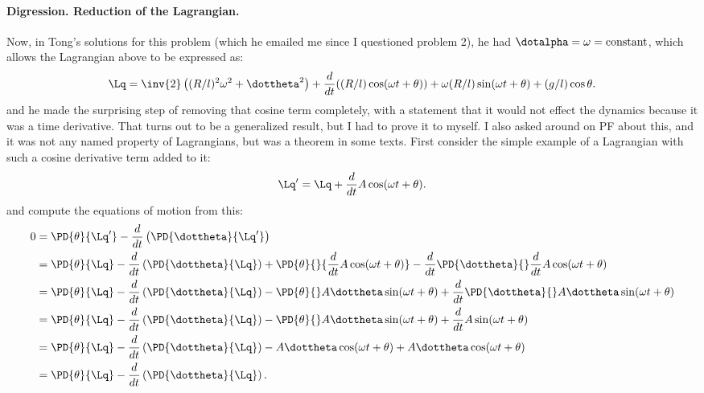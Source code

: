 {\paragraph{Digression.  Reduction of the Lagrangian.}
\label{chap:PJTongMf1:addDerivative}
%
Now, in Tong's solutions for this problem (which he emailed me since I questioned problem 2), he had \(\dotalpha = \omega = \text{constant}\), which allows the
Lagrangian above to be expressed as:
%
\begin{equation}\label{eqn:tongMf1:1560}
\Lq =
\inv{2} \left( (R/l)^2 \omega^2 + \dottheta^2 \right)
+ \frac{d}{dt} ((R/l) \cos( \omega t + \theta )) + \omega (R/l) \sin(\omega t + \theta)
+ (g/l) \cos\theta.
\end{equation}
%
and he made the surprising step of removing that cosine term completely, with a statement that it would not effect the dynamics because it was a time derivative.
That turns out to be a generalized result, but I had to prove it to myself.  I also asked around on PF about this, and it was not any named property of Lagrangians,
but was a theorem in some texts.
%
First consider the simple example of a Lagrangian with such a cosine derivative term added to it:
%
\begin{equation}\label{eqn:tongMf1:1580}
\Lq' = \Lq + \frac{d}{dt} A \cos(\omega t + \theta).
\end{equation}
%
and compute the equations of motion from this:
\begin{equation}\label{eqn:tongMf1:520}
\begin{aligned}
0
&= \PD{\theta}{\Lq'} - \frac{d}{dt}\left(\PD{\dottheta}{\Lq'}\right) \\
&= \PD{\theta}{\Lq} - \frac{d}{dt}\left(\PD{\dottheta}{\Lq}\right)
+ \PD{\theta}{} {\frac{d}{dt} A \cos(\omega t + \theta)}
- \frac{d}{dt} \PD{\dottheta}{} \frac{d}{dt} A \cos(\omega t + \theta) \\
&= \PD{\theta}{\Lq} - \frac{d}{dt}\left(\PD{\dottheta}{\Lq}\right)
- \PD{\theta}{} A \dottheta \sin(\omega t + \theta) +
\frac{d}{dt} \PD{\dottheta}{} A \dottheta \sin(\omega t + \theta) \\
&= \PD{\theta}{\Lq} - \frac{d}{dt}\left(\PD{\dottheta}{\Lq}\right)
- \PD{\theta}{} A \dottheta \sin(\omega t + \theta) + \frac{d}{dt} A \sin(\omega t + \theta) \\
&= \PD{\theta}{\Lq} - \frac{d}{dt}\left(\PD{\dottheta}{\Lq}\right)
- A \dottheta \cos(\omega t + \theta) + A \dottheta \cos(\omega t + \theta) \\
&= \PD{\theta}{\Lq} - \frac{d}{dt}\left(\PD{\dottheta}{\Lq}\right)  .

\end{aligned}
\end{equation}}
